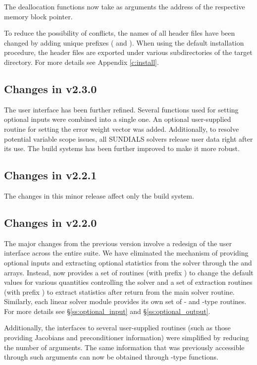 The deallocation functions now take as arguments the address of the respective 
memory block pointer.

To reduce the possibility of conflicts, the names of all header files have
been changed by adding unique prefixes ( and ).
When using the default installation procedure, the header files are exported
under various subdirectories of the target  directory. For more
details see Appendix \ref{c:install}.

\subsection*{Changes in v2.3.0}

The user interface has been further refined. Several functions used
for setting optional inputs were combined into a single one.  An optional
user-supplied routine for setting the error weight vector was added.
Additionally, to resolve potential variable scope issues, all
SUNDIALS solvers release user data right after its use. The build
systems has been further improved to make it more robust.

\subsection*{Changes in v2.2.1}

The changes in this minor {\sundials} release affect only the build system.

\subsection*{Changes in v2.2.0}

The major changes from the previous version involve a redesign of the
user interface across the entire {\sundials} suite. We have eliminated the
mechanism of providing optional inputs and extracting optional statistics 
from the solver through the  and  arrays. Instead,
{\cvode} now provides a set of routines (with prefix )
to change the default values for various quantities controlling the
solver and a set of extraction routines (with prefix )
to extract statistics after return from the main solver routine.
Similarly, each linear solver module provides its own set of {-}
and {-type} routines. For more details see \S\ref{ss:optional_input}
and \S\ref{ss:optional_output}.

Additionally, the interfaces to several user-supplied routines
(such as those providing Jacobians and preconditioner information) 
were simplified by reducing the number
of arguments. The same information that was previously accessible
through such arguments can now be obtained through {-type}
functions.


